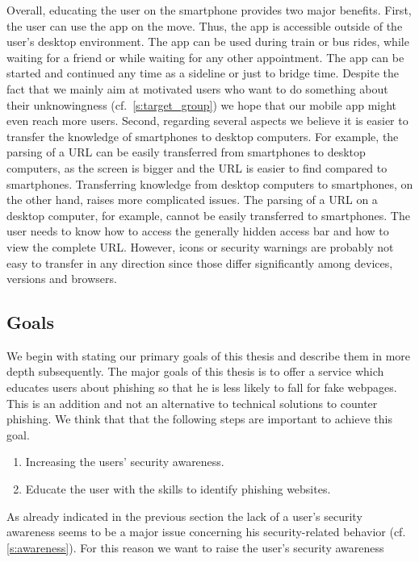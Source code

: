 Overall, educating the user on the smartphone provides two major benefits.
 First, the user can use the app on the move.
 Thus, the app is accessible outside of the user's desktop environment.
 The app can be used during train or bus rides, while waiting for a friend or while waiting for any other appointment.
 The app can be started and continued any time as a sideline or just to bridge time.
Despite the fact that we mainly aim at motivated users who want to do something about their unknowingness (cf.~\autoref{s:target_group}) we hope that our mobile app might even reach more users.
 Second, regarding several aspects we believe it is easier to transfer the knowledge of smartphones to desktop computers.
For example, the parsing of a URL can be easily transferred from smartphones to desktop computers, as the screen is bigger and the URL is easier to find compared to smartphones.
 Transferring knowledge from desktop computers to smartphones, on the other hand, raises more complicated issues.
The parsing of a URL on a desktop computer, for example, cannot be easily transferred to smartphones.
The user needs to know how to access the generally hidden access bar and how to view the complete URL.
However, icons or security warnings are probably not easy to transfer in any direction since those differ significantly among devices, versions and browsers.

 
\subsection{Goals}
\label{s:goals}
We begin with stating our primary goals of this thesis and describe them in more depth subsequently.
The major goals of this thesis is to offer a service which educates users about phishing so that he is less likely to fall for fake webpages.
 This is an addition and not an alternative to technical solutions to counter phishing.
 We think that that the following steps are important to achieve this goal.

\begin{enumerate}
	\item Increasing the users' security awareness.
	\item Educate the user with the skills to identify phishing websites.
\end{enumerate}

As already indicated in the previous section the lack of a user's security awareness seems to be a major issue concerning his security-related behavior (cf. \autoref{s:awareness}).
 For this reason we want to raise the user's security awareness 
 
